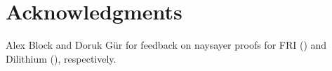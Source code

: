 \section*{Acknowledgments}

Alex Block and Doruk G\"ur for feedback on naysayer proofs for FRI () and Dilithium (), respectively.

